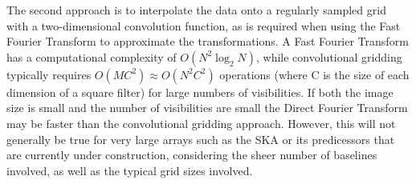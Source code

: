 \documentclass[a4paper,10pt]{report}
\begin{document}
 The second approach is to interpolate the data onto a regularly sampled grid with a two-dimensional convolution function, as is required when using the Fast Fourier Transform to approximate the transformations. A Fast Fourier Transform has a computational complexity of $O(N^2\log_2{N})$, while
 convolutional gridding typically requires $O(MC^2) \approx O(N^2C^2)$ operations (where C is the size of each dimension of a square filter) for large numbers of visibilities. If both the image size is small and the number of visibilities 
 are small the Direct Fourier Transform may be faster than the convolutional gridding approach. However, this will not generally be true for very large arrays such as the SKA or its predicessors that are currently under construction, 
 considering the sheer number of baselines involved, as well as the typical grid sizes involved.
 
\end{document}
